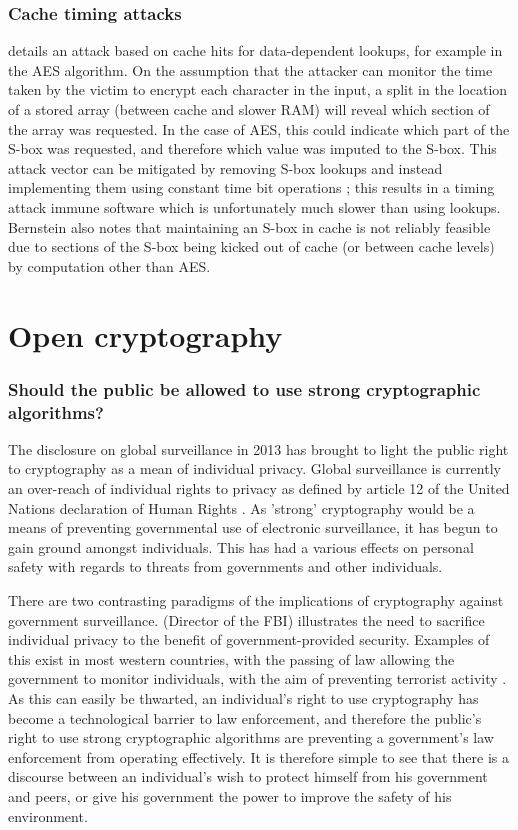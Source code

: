 \documentclass[british,10pt,a4paper]{article}
\begin{document}
\subsubsection{Cache timing attacks}
\citet{Bernstein05cache-timingattacks} details an attack based on cache hits for data-dependent lookups, for example in the AES algorithm. On the assumption that the attacker can monitor the time taken by the victim to encrypt each character in the input, a split in the location of a stored array (between cache and slower RAM) will reveal which section of the array was requested. In the case of AES, this could indicate which part of the S-box was requested, and therefore which value was imputed to the S-box. This attack vector can be mitigated by removing S-box lookups and instead implementing them using constant time bit operations \cite{Bernstein05cache-timingattacks}; this results in a timing attack immune software which is unfortunately much slower than using lookups.
Bernstein also notes that maintaining an S-box in cache is not reliably feasible due to sections of the S-box being kicked out of cache (or between cache levels) by computation other than AES. 

\clearpage
\section{Open cryptography}
\subsubsection{Should the public be allowed to use strong cryptographic algorithms?}

The disclosure on global surveillance in 2013 has brought to light the public right to cryptography as a mean of individual privacy. Global surveillance is currently an over-reach of individual rights to privacy as defined by article 12 of the United Nations declaration of Human Rights \cite{udhr}. As 'strong' cryptography would be a means of preventing governmental use of electronic surveillance, it has begun to gain ground amongst individuals. This has had a various effects on personal safety with regards to threats from governments and other individuals.

There are two contrasting paradigms of the implications of cryptography against government surveillance. \citet{James_B_Coney} (Director of the FBI) illustrates the need to sacrifice individual privacy to the benefit of government-provided security. Examples of this exist in most western countries, with the passing of law allowing the government to monitor individuals, with the aim of preventing terrorist activity \cite{data_retention}. As this can easily be thwarted, an individual's right to use cryptography has become a technological barrier to law enforcement, and therefore the public's right to use strong cryptographic algorithms are preventing a government's law enforcement from operating effectively. It is therefore simple to see that there is a discourse between an individual's wish to protect himself from his government and peers, or give his government the power to improve the safety of his environment.
\end{document}
